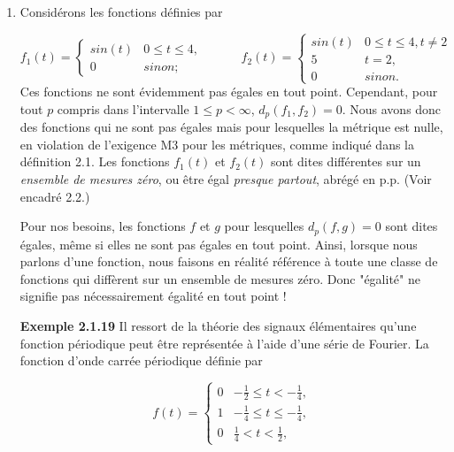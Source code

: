 \documentclass[11pt,twoside,a4paper]{article}
\begin{document}
\begin{enumerate}
  \item Considérons les fonctions définies par
  
  \begin{equation*}
    f_1(t) = \begin{cases} sin(t) & 0 \leq t \leq 4, \\
      0 & sinon;
          \end{cases} \quad \quad \quad
    f_2(t) = \begin{cases} sin(t) & 0 \leq t \leq 4, t \neq 2 \\
      5 & t = 2, \\
      0 & sinon.
          \end{cases}
  \end{equation*}
  \noindent
  Ces fonctions ne sont évidemment pas égales en tout point. Cependant, pour tout $p$ compris dans l'intervalle $1 \leq p < \infty$, $d_p(f_1, f_2) = 0$. Nous avons donc des fonctions qui ne sont pas égales mais pour lesquelles la métrique est nulle, en violation de l'exigence M3 pour les métriques, comme indiqué dans la définition 2.1. 
  Les fonctions $f_1(t)$ et $f_2(t)$ sont dites différentes sur un \textit{ensemble de mesures zéro}, ou être égal \textit{presque partout}, abrégé en p.p. (Voir encadré 2.2.)

  Pour nos besoins, les fonctions $f$ et $g$ pour lesquelles $d_p(f, g) = 0$ sont dites égales, même si elles ne sont pas égales en tout point. Ainsi, lorsque nous parlons d'une fonction, nous faisons en réalité référence à toute une classe de fonctions qui diffèrent sur un ensemble de mesures zéro. 
  Donc "égalité" ne signifie pas nécessairement égalité en tout point !
  \vspace{4mm}

  \noindent
  \textbf{Exemple 2.1.19} Il ressort de la théorie des signaux élémentaires qu'une fonction périodique peut être représentée à l'aide d'une série de Fourier. La fonction d'onde carrée périodique définie par

  \begin{equation*}
    f(t) = \begin{cases} 0 & - \frac{1}{2} \leq t < - \frac{1}{4}, \\
      1 &  - \frac{1}{4} \leq t \leq - \frac{1}{4}, \\
      0 & \frac{1}{4} < t < \frac{1}{2},
          \end{cases}
  \end{equation*}


\end{enumerate}
\end{document}
